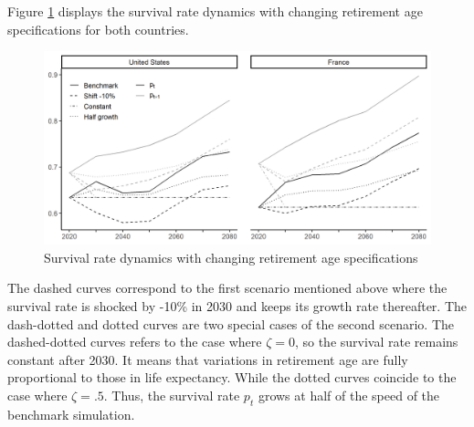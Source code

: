 Figure \ref{fig:retage_p} displays the survival rate dynamics with changing retirement age specifications for both countries.
\begin{figure}[tb]
	\centering
	\caption{Survival rate dynamics with changing retirement age specifications} \label{fig:retage_p}
	\includegraphics[width=1\linewidth]{../result/retirement/retage_p.png}
\end{figure}
The dashed curves correspond to the first scenario mentioned above where the survival rate is shocked by -10\% in 2030 and keeps its growth rate thereafter. The dash-dotted and dotted curves are two special cases of the second scenario. The dashed-dotted curves refers to the case where $\zeta = 0$, so the survival rate remains constant after 2030. It means that variations in retirement age are fully proportional to those in life expectancy. While the dotted curves coincide to the case where $\zeta = .5$. Thus, the survival rate $p_t$ grows at half of the speed of the benchmark simulation.

